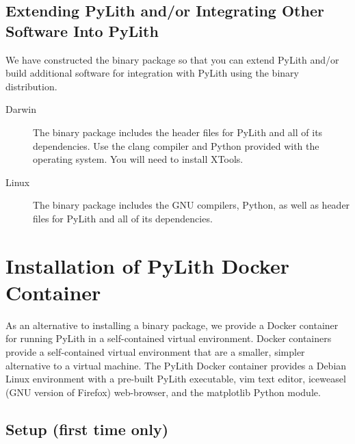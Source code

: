 \subsection{Extending PyLith and/or Integrating Other Software Into PyLith}

We have constructed the binary package so that you can extend PyLith
and/or build additional software for integration with PyLith using the
binary distribution.

\begin{description}
\item[Darwin] The binary package includes the header files for PyLith
  and all of its dependencies. Use the clang compiler and Python
  provided with the operating system. You will need to install XTools.
\item[Linux] The binary package includes the GNU compilers, Python, as
  well as header files for PyLith and all of its dependencies.
\end{description}


\section{Installation of PyLith Docker Container}

As an alternative to installing a binary package, we provide a Docker
container for running PyLith in a self-contained virtual
environment. Docker containers provide a self-contained virtual
environment that are a smaller, simpler alternative to a virtual
machine. The PyLith Docker container provides a Debian Linux
environment with a pre-built PyLith executable, vim text editor,
iceweasel (GNU version of Firefox) web-browser, and the matplotlib
Python module.


\subsection{Setup (first time only)}

